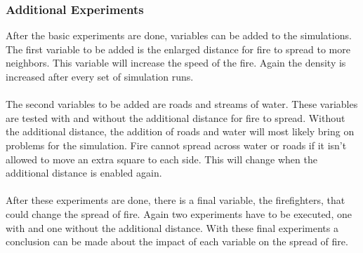 \documentclass{article}
\begin{document}
\begin{multicols}{2}
\subsubsection*{Additional Experiments}
After the basic experiments are done, variables can be added to the simulations. The first variable to be added is the enlarged distance for fire to spread to more neighbors. This variable will increase the speed of the fire. Again the density is increased after every set of simulation runs.\\\\
The second variables to be added are roads and streams of water. These variables are tested with and without the additional distance for fire to spread. Without the additional distance, the addition of roads and water will most likely bring on problems for the simulation. Fire cannot spread across water or roads if it isn't allowed to move an extra square to each side. This will change when the additional distance is enabled again.\\\\
After these experiments are done, there is a final variable, the firefighters, that could change the spread of fire. Again two experiments have to be executed, one with and one without the additional distance. With these final experiments a conclusion can be made about the impact of each variable on the spread of fire.


\end{multicols}
\end{document}
